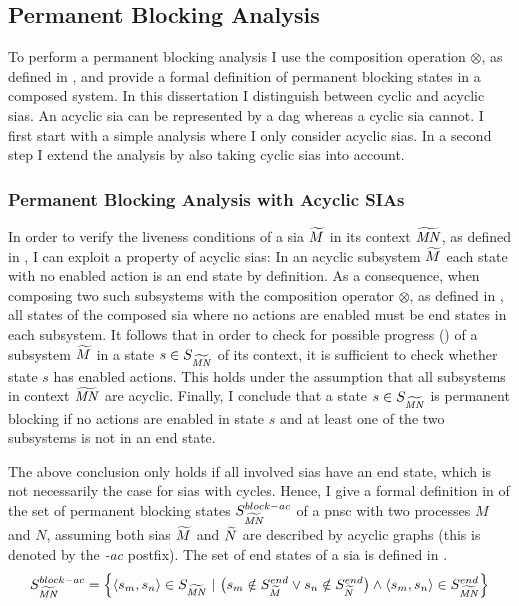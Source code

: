 \subsection{Permanent Blocking Analysis}
\label{sect_block_analysis}
To perform a permanent blocking analysis I use the composition operation $\otimes$, as defined in \Sect{\ref{sect_sia_composition}}, and provide a formal definition of permanent blocking states in a composed system.
In this dissertation I distinguish between cyclic and acyclic \glspl{sia}.
An acyclic \gls{sia} can be represented by a \gls{dag} whereas a cyclic \gls{sia} cannot.
I first start with a simple analysis where I only consider acyclic \glspl{sia}.
In a second step I extend the analysis by also taking cyclic \glspl{sia} into account.

\subsubsection{Permanent Blocking Analysis with Acyclic SIAs}
\label{sect_block_perm_ac}
In order to verify the liveness conditions of a \gls{sia} $\widetilde{M}$ in its context $\widetilde{\mathit{MN}}$, as defined in \Def{\ref{def_liveness_sia_state}}, I can exploit a property of acyclic \glspl{sia}:
In an acyclic subsystem $\widetilde{M}$ each state with no enabled action is an end state by definition.
As a consequence, when composing two such subsystems with the composition operator $\otimes$, as defined in \Def{\ref{def_sia_comp}}, all states of the composed \gls{sia} where no actions are enabled must be end states in each subsystem.
It follows that in order to check for possible progress () of a subsystem $\widetilde{M}$ in a state $s \in S_{\widetilde{\mathit{MN}}}$ of its context, it is sufficient to check whether state $s$ has enabled actions.
This holds under the assumption that all subsystems in context $\widetilde{\mathit{MN}}$ are acyclic.
Finally, I conclude that a state $s \in S_{\widetilde{\mathit{MN}}}$ is permanent blocking if no actions are enabled in state $s$ and at least one of the two subsystems is not in an end state.

The above conclusion only holds if all involved \glspl{sia} have an end state, which is not necessarily the case for \glspl{sia} with cycles.
Hence, I give a formal definition in \Equ{\ref{eq_sia_block_end}} of the set of permanent blocking states $S_{\widetilde{\mathit{MN}}}^{block-ac}$ of a \gls{pnsc} with two processes $M$ and $N$, assuming both \glspl{sia} $\widetilde{M}$ and $\widetilde{N}$ are described by acyclic graphs (this is denoted by the \emph{-ac} postfix).
The set of end states of a \gls{sia} is defined in \Equ{\ref{eq_sia_end}}.
\begin{equation}
    \label{eq_sia_block_end}
    S_{\widetilde{\mathit{MN}}}^{block-ac} = \Big \{\langle s_m, s_n \rangle \in S_{\widetilde{\mathit{MN}}} \ | \
        \big ( s_m \notin S_{\widetilde{M}}^{end} \lor s_n \notin S_{\widetilde{N}}^{end} \big ) \land \langle s_m, s_n \rangle \in S_{\widetilde{\mathit{MN}}}^{end} \Big \}
\end{equation}

